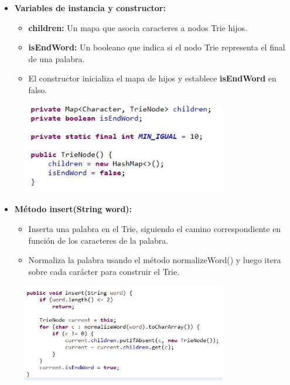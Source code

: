\documentclass{article}
\begin{document}
	\begin{itemize}
	\item \textbf{Variables de instancia y constructor:}
	 \begin{itemize}
	 \item \textbf{children:} Un mapa que asocia caracteres a nodos Trie hijos.
	 \item \textbf{isEndWord:} Un booleano que indica si el nodo Trie representa el final de una palabra.
	 \item El constructor inicializa el mapa de hijos y establece \textbf{isEndWord} en falso.
	 \end{itemize}
	\end{itemize}
	 \begin{figure}[H]
		\centering
		\includegraphics[width=0.8\textwidth,keepaspectratio]{img/TN1.jpg}
	\end{figure}
	
	\begin{itemize}
	\item \textbf{Método insert(String word):}
	 \begin{itemize}
	 \item Inserta una palabra en el Trie, siguiendo el camino correspondiente en función de los caracteres de la palabra.
	 \item Normaliza la palabra usando el método normalizeWord() y luego itera sobre cada carácter para construir el Trie.
	 \end{itemize}
	\end{itemize}
	 \begin{figure}[H]
		\centering
		\includegraphics[width=0.8\textwidth,keepaspectratio]{img/TN2.jpg}
	\end{figure}
	
\end{document}
